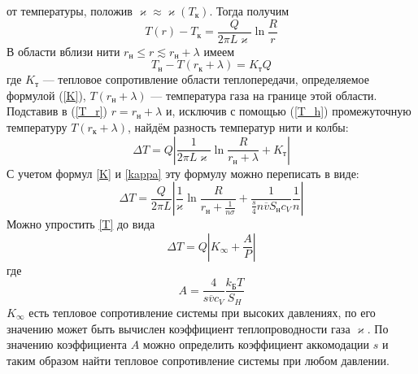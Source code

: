 \documentclass[12pt]{article}
\begin{document}
        от температуры, положив $\varkappa \approx \varkappa(T_{\text{к}})$. Тогда получим
        \begin{equation}\label{T_r}
            T(r) - T_{\text{к}} = \frac{Q}{2\pi L\varkappa}\ln \frac{R}{r}
        \end{equation}
        В области вблизи нити $r_{\text{н}} \le r \lesssim r_{\text{н}} + \lambda$ имеем
        \begin{equation}\label{T_h}
            T_{\text{н}} - T(r_{\text{к}} + \lambda) = K_{\text{т}}Q
        \end{equation}
        где $K_{\text{т}}$ — тепловое сопротивление области теплопередачи, определяемое формулой (\ref{K}), $T(r_{\text{н}} + \lambda)$ — температура газа на границе этой области. Подставив
        в (\ref{T_r}) $r = r_{\text{н}} + \lambda$ и, исключив с помощью (\ref{T_h}) промежуточную температуру $T(r_{\text{к}} + \lambda)$, найдём разность температур нити и колбы:
        \begin{equation}
            \Delta T = Q \left|\frac{1}{2\pi L \varkappa}\ln\frac{R}{r_{\text{н}}+\lambda} + K_{\text{т}} \right|
        \end{equation}
        С учетом формул \ref{K} и \ref{kappa} эту формулу можно переписать в виде:
        \begin{equation}\label{T}
            \Delta T = \frac{Q}{2\pi L}\left| \frac{1}{\varkappa}\ln\frac{R}{r_{\text{н}}+\frac{1}{n\sigma}} +\frac{1}{\frac{s}{4} n \overline{v} S_{\text{н}}c_V} \frac{1}{n}\right|
        \end{equation}
        Можно упростить \ref{T} до вида
        \begin{equation}
            \Delta T = Q \left|K_{\infty} + \frac{A}{P}\right|
        \end{equation}
        где
        \[
            A = \frac{4}{s\overline{v}c_V}\frac{k_{\text{Б}}T}{S_H}
        \]
        $K_{\infty}$ есть тепловое сопротивление системы при высоких давлениях,
        по его значению может быть вычислен коэффициент теплопроводности газа $\varkappa$. По значению коэффициента $A$ можно определить коэффициент
        аккомодации $s$ и таким образом найти тепловое сопротивление системы при любом давлении.
\end{document}
